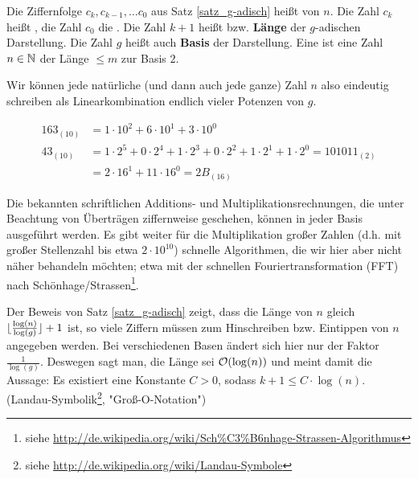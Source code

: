 \begin{defn}
	Die Ziffernfolge $c_k, c_{k-1}, \dots c_0$ aus Satz \ref{satz_g-adisch} heißt  von $n$. 
	Die Zahl $c_k$ heißt , die Zahl $c_0$ die . 
	Die Zahl $k+1$ heißt  bzw. \textbf{Länge} der $g$-adischen Darstellung. 
	Die Zahl $g$ heißt auch \textbf{Basis} der Darstellung. 
	Eine  ist eine Zahl $n \in \mathbb{N}$ der Länge $\leq m$ zur Basis $2$. 
	 
\end{defn}

\begin{bem}
	Wir können jede natürliche (und dann auch jede ganze) Zahl $n$ also eindeutig schreiben als Linearkombination endlich vieler Potenzen von $g$.
\end{bem}

\begin{bsp}
 \begin{equation}
 \begin{aligned}
	 163_{(10)} &= 1 \cdot 10^2 + 6 \cdot 10^1 + 3 \cdot 10^0 \\
	 43_{(10)}	&= 1 \cdot 2^5 + 0 \cdot 2^4 + 1 \cdot 2^3 + 0 \cdot 2^2 + 1 \cdot 2^1 + 1 \cdot 2^0 = 101011_{(2)} \\
	 &= 2 \cdot 16^1 + 11 \cdot 16^0 = 2B_{(16)}
 \end{aligned}
 \end{equation}
\end{bsp}

Die bekannten schriftlichen Additions- und Multiplikationsrechnungen, die unter Beachtung von Überträgen ziffernweise geschehen, können in jeder Basis ausgeführt werden. 
Es gibt weiter für die Multiplikation großer Zahlen (d.h. mit großer Stellenzahl bis etwa $2 \cdot 10^{10}$) schnelle Algorithmen, die wir hier aber nicht näher behandeln möchten; etwa mit der schnellen Fouriertransformation (FFT) nach Schönhage/Strassen\footnote{siehe \url{http://de.wikipedia.org/wiki/Sch\%C3\%B6nhage-Strassen-Algorithmus}}.

Der Beweis von Satz \ref{satz_g-adisch} zeigt, dass die Länge von $n$ gleich $\lfloor\frac{\log(n)}{\log(g)}\rfloor+1$ ist, so viele Ziffern müssen zum Hinschreiben bzw. Eintippen von $n$ angegeben werden. 
Bei verschiedenen Basen ändert sich hier nur der Faktor $\frac{1}{\log(g)}$. 
Deswegen sagt man, die Länge sei $\mathcal{O}(\log(n))$ und meint damit die Aussage: Es existiert eine Konstante $C > 0$, sodass $k + 1 \leq C \cdot \log(n)$. 
(Landau-Symbolik\footnote{siehe \url{http://de.wikipedia.org/wiki/Landau-Symbole}}, "Groß-O-Notation")

